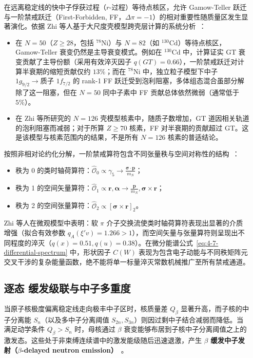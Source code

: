 在远离稳定线的快中子俘获过程（$r$-过程）等待点核区，允许 Gamow-Teller 跃迁与一阶禁戒跃迁（First-Forbidden, FF，$\Delta \pi = -1$）的相对重要性随质量区发生显著演化。依据 Zhi 等人基于大尺度壳模型跨壳层计算的系统分析~\cite{doctoral-r1-g34-zhi-2013-prc-shell-model-half-lives}：
\begin{itemize}
\item 在 $N=50$（$Z \ge 28$，包括 $^{78}\mathrm{Ni}$）与 $N=82$（如 $^{130}\mathrm{Cd}$）等待点核区，Gamow-Teller 衰变仍然是主导衰变模式。例如在 $^{130}\mathrm{Cd}$ 中，计算证实 GT 衰变贡献了主导份额（采用有效淬灭因子 $q(GT) = 0.66$），一阶禁戒跃迁对计算半衰期的缩短贡献仅约 $13\%$；而在 $^{78}\mathrm{Ni}$ 中，独立粒子模型下中子 $1g_{9/2} \to \text{质子 } 1f_{7/2}$ 的 rank-1 FF 跃迁受到泡利阻塞，多体组态混合虽部分解除了这一阻塞，但在 $N=50$ 同中子素中 FF 贡献总体依然微弱（通常低于 $5\%$）。
\item 在 Zhi 等所研究的 $N=126$ 壳模型核素中，随质子数增加，GT 道因相关轨道的泡利阻塞而减弱；对于所算 $Z \ge 70$ 核素，FF 对半衰期的贡献超过 GT。这是该模型与核素范围内的结果，不是所有 $N=126$ 核素的普适结论。
\end{itemize}
按照非相对论约化分解，一阶禁戒算符包含不同张量秩与空间对称性的结构~\cite{doctoral-r1-g34-zhi-2013-prc-shell-model-half-lives}：
\begin{itemize}
\item 秩为 0 的类时轴荷算符：$\hat{\mathcal{O}}_0 \propto \gamma_5 \to \frac{\boldsymbol{\sigma} \cdot \mathbf{p}}{m_N}$；
\item 秩为 1 的空间矢量算符：$\hat{\mathcal{O}}_1 \propto \mathbf{r}, \boldsymbol{\alpha} \to \frac{\mathbf{p}}{m_N}, \boldsymbol{\sigma}\times\mathbf{r}$；
\item 秩为 2 的空间张量算符：$\hat{\mathcal{O}}_2 \propto [\boldsymbol{\sigma} \times \mathbf{r}]_2$。
\end{itemize}
Zhi 等人在微观模型中表明：软 $\pi$ 介子交换流使类时轴荷算符表现出显著的介质增强（拟合有效参数 $q_A(\xi' v) = 1.266 > 1$），而空间矢量与张量算符则呈现出不同程度的淬灭（$q(x) = 0.51, q(u) = 0.38$）。在微分能谱公式~\eqref{eq:4-7-differential-spectrum} 中，形状因子 $C(W)$ 表现为包含电子动能与不同秩矩阵元交叉干涉的复杂能量函数，绝不能将单一标量淬灭常数机械推广至所有禁戒通道。

\subsection{逐态 \beta 缓发级联与中子多重度}\label{sec:4-7-2}

当原子核极度偏离稳定线走向极丰中子区时，核质量差 $Q_\beta$ 显著升高，而子核的中子分离能 $S_n$（以及多中子分离阈值 $S_{2n}, S_{3n}$）则因过剩中子结合减弱而降低。当满足动学条件 $Q_\beta > S_n$ 时，母核通过 $\beta$ 衰变能够布居到子核中子分离阈值之上的激发态。这些处于非束缚连续谱中的激发能级随后迅速退激，产生 \textbf{$\beta$ 缓发中子发射（$\beta$-delayed neutron emission）}~\cite{dimitriou-2021-iaea-beta-delayed-neutron-database}。

